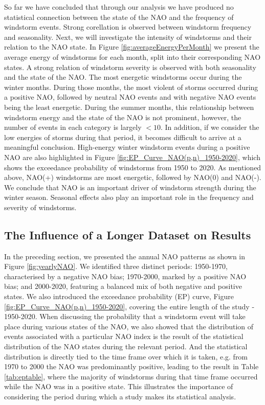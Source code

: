         So far we have concluded that through our analysis we have produced no statistical connection between the state of the NAO and the frequency of windstorm events. Strong corellation is observed between windstorm frequency and seasonality. Next, we will investigate the intensity of windstorms and their relation to the NAO state. In Figure \ref{fig:averageEnergyPerMonth} we present the average energy of windstorms for each month, split into their corresponding NAO states. A strong relation of windstorm severity is observed with both seasonality and the state of the NAO. The most energetic windstorms occur during the winter months. During those months, the most violent of storms occurred during a positive NAO, followed by neutral NAO events and with negative NAO events being the least energetic. During the summer months, this relationship between windstorm energy and the state of the NAO is not prominent, however, the number of events in each category is largely $<10$. In addition, if we consider the low energies of storms during that period, it becomes difficult to arrive at a meaningful conclusion.
        High-energy winter windstorm events during a positive NAO are also highlighted in Figure \ref{fig:EP_Curve_NAO(p,n)_1950-2020}, which shows the exceedance probability of windstorms from 1950 to 2020. As mentioned above, NAO(+) windstorms are most energetic, followed by NAO(0) and NAO(-). We conclude that NAO is an important driver of windstorm strength during the winter season. Seasonal effects also play an important role in the frequency and severity of windstorms.
    
    \subsection{The Influence of a Longer Dataset on Results}

        In the preceding section, we presented the annual NAO patterns as shown in Figure \ref{fig:yearlyNAO}. We identified three distinct periods: 1950-1970, characterised by a negative NAO bias; 1970-2000, marked by a positive NAO bias; and 2000-2020, featuring a balanced mix of both negative and positive states. We also introduced the exceedance probability (EP) curve, Figure \ref{fig:EP_Curve_NAO(p,n)_1950-2020}, covering the entire length of the study - 1950-2020. When discussing the probability that a windstorm event will take place during various states of the NAO, we also showed that the distribution of events associated with a particular NAO index is the result of the statistical distribution of the NAO states during the relevant period. And the statistical distribution is directly tied to the time frame over which it is taken, e.g. from 1970 to 2000 the NAO was predominantly positive, leading to the result in Table \ref{tab:eptable}, where the majority of windstorms during that time frame occurred while the NAO was in a positive state. This illustrates the importance of considering the period during which a study makes its statistical analysis. 

